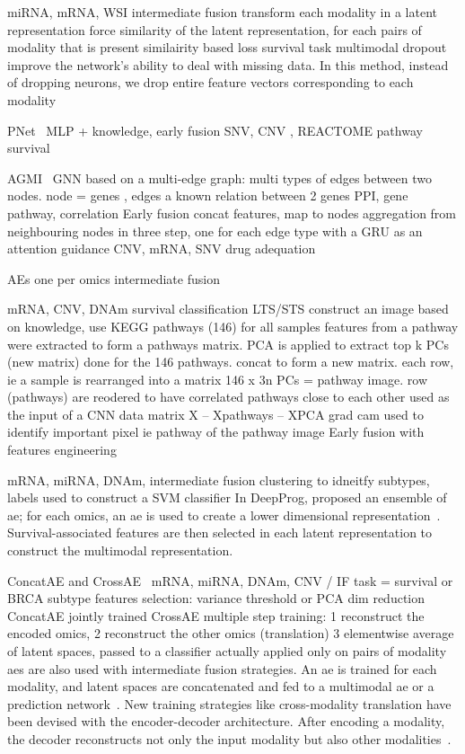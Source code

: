 \documentclass[../main.tex]{subfiles}
\begin{document}
\cite{Cheerla2019}
miRNA, mRNA, WSI 
intermediate fusion transform each modality in a latent representation 
force similarity of the latent representation, for each pairs of modality that is present similairity based loss 
survival task 
multimodal dropout improve the network’s ability to deal with missing data. In this method, instead of dropping neurons, we drop entire feature vectors corresponding to each modality

PNet~\cite{PNet} MLP + knowledge, early fusion
SNV, CNV , REACTOME pathway survival 

AGMI~\cite{AGMI} GNN based on a multi-edge graph: multi types of edges between two nodes. node = genes , edges a known relation between 2 genes PPI, gene pathway, correlation 
Early fusion concat features, map to nodes 
aggregation from neighbouring nodes in three step, one for each edge type with a GRU as an attention guidance 
CNV, mRNA, SNV drug adequation 

\cite{Ma2019} AEs one per omics intermediate fusion 

\cite{PathCNN}
mRNA, CNV, DNAm survival classification LTS/STS
construct an image based on knowledge, use KEGG pathways (146)
for all samples features from a pathway were extracted to form a pathways matrix. PCA is applied to extract top k PCs (new matrix) done for the 146 pathways. concat to form a new matrix. 
each row, ie a sample is rearranged into a matrix 146 x 3n PCs = pathway image. row (pathways) are reodered to have correlated pathways close to each other 
used as the input of a CNN
data matrix X -- Xpathways -- XPCA
grad cam used to identify important pixel ie pathway of the pathway image
Early fusion with features engineering

\cite{DeepProg} mRNA, miRNA, DNAm, intermediate fusion 
clustering to idneitfy subtypes, labels used to construct a SVM classifier 
In DeepProg, \citeauthor{DeepProg} proposed an ensemble of \gls{ae}; for each omics, an \gls{ae} is used to create a lower dimensional representation~\cite{DeepProg}.
Survival-associated features are then selected in each latent representation to construct the multimodal representation.

ConcatAE and CrossAE~\cite{CrossAE} mRNA, miRNA, DNAm, CNV / IF
task = survival or BRCA subtype 
features selection: variance threshold or PCA dim reduction
ConcatAE jointly trained
CrossAE multiple step training: 1 reconstruct the encoded omics, 2 reconstruct the other omics (translation) 3 elementwise average of latent spaces, passed to a classifier
actually applied only on pairs of modality
\glspl{ae} are also used with intermediate fusion strategies. 
An \gls{ae} is trained for each modality, and latent spaces are concatenated and fed to a multimodal \gls{ae} or a prediction network~\cite{CrossAE, HierachicalAE}.
New training strategies like cross-modality translation have been devised with the encoder-decoder architecture. 
After encoding a modality, the decoder reconstructs not only the input modality but also other modalities~\cite{CrossAE}.
\end{document}

